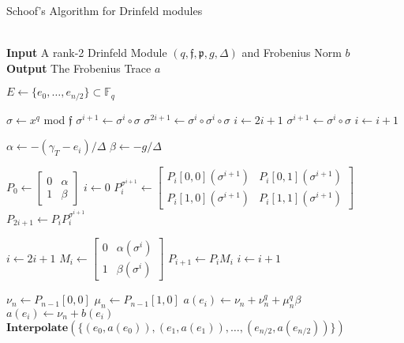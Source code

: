 \documentclass{jams-l}
\theoremstyle{remark}
\numberwithin{equation}{section}
\newcommand{\frakf}{\mathfrak{f}}
\begin{document}
 \begin{algorithm}
\caption{Schoof's Algorithm for Drinfeld modules}\label{euclid}
\begin{algorithmic}[1]
 \\
\hspace*{\algorithmicindent} \textbf{Input} A rank-2 Drinfeld Module $(q,\frakf,\mathfrak{p}, g, \Delta)$ and Frobenius Norm $b$\\
 \hspace*{\algorithmicindent} \textbf{Output} The Frobenius Trace $a$
 
 \State $E \gets \{e_0, \ldots, e_{n/2}\} \subset \mathbb{F}_q$

\State $\sigma \gets x^q$ mod $\mathfrak{f}$
\State $\sigma^{i + 1} \gets \sigma^i \circ \sigma$
\State $\sigma^{2i + 1} \gets \sigma^i \circ \sigma^i \circ \sigma$
\State $i \gets 2i+1$
\Else
\State $\sigma^{i+1} \gets \sigma^i \circ \sigma$
\State $i \gets i+1$
\EndIf
\EndWhile
 
\State $\alpha \gets -(\gamma_T - e_i)/\Delta$
\State $\beta \gets -g/\Delta$

\State $P_0 \gets \begin{bmatrix} 0 & \alpha \\ 1 & \beta \end{bmatrix}$
\State $i \gets 0$
\State $P_i^{\sigma^{i+1}} \gets \begin{bmatrix} P_{i}[0,0](\sigma^{i+1}) & P_{i}[0,1](\sigma^{i+1}) \\ P_{i}[1,0](\sigma^{i+1}) & P_{i}[1,1](\sigma^{i+1}) \end{bmatrix}$
\State $P_{2i+1} \gets P_iP_i^{\sigma^{i+1}}$

\State $i \gets 2i+1$
\Else
\State $M_i \gets \begin{bmatrix} 0 & \alpha(\sigma^{i}) \\ 1 & \beta(\sigma^{i}) \end{bmatrix}$
\State $P_{i+1} \gets P_iM_i$
\State $i \gets i+1$
\EndIf
\EndWhile

\State $\nu_{n} \gets P_{n-1}[0,0]$
\State $\mu_n \gets P_{n-1}[1,0]$
\State $a(e_i) \gets \nu_n + \nu_n^q + \mu_n^q \beta$
\Else
\State $a(e_i) \gets \nu_n + b(e_i)$
\EndIf
\EndFor
\Return $\textbf{Interpolate}(\{ (e_0, a(e_0)), (e_1, a(e_1)), \ldots, (e_{n/2}, a(e_{n/2})) \})$

\EndProcedure
\end{algorithmic}
\end{algorithm}
\end{document}
